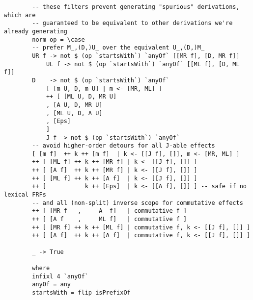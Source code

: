 \small
\begin{verbatim}
		-- these filters prevent generating "spurious" derivations, which are
		-- guaranteed to be equivalent to other derivations we're already generating
		norm op = \case
		-- prefer M_,(D,)U_ over the equivalent U_,(D,)M_
		UR f -> not $ (op `startsWith`) `anyOf` [[MR f], [D, MR f]]
			UL f -> not $ (op `startsWith`) `anyOf` [[ML f], [D, ML f]]
		D    -> not $ (op `startsWith`) `anyOf`
			[ [m U, D, m U] | m <- [MR, ML] ]
			++ [ [ML U, D, MR U]
			, [A U, D, MR U]
			, [ML U, D, A U]
			, [Eps]
			]
			J f -> not $ (op `startsWith`) `anyOf`
		-- avoid higher-order detours for all J-able effects
		[ [m f]  ++ k ++ [m f]  | k <- [[J f], []], m <- [MR, ML] ]
		++ [ [ML f] ++ k ++ [MR f] | k <- [[J f], []] ]
		++ [ [A f]  ++ k ++ [MR f] | k <- [[J f], []] ]
		++ [ [ML f] ++ k ++ [A f]  | k <- [[J f], []] ]
		++ [           k ++ [Eps]  | k <- [[A f], []] ] -- safe if no lexical FRFs
		-- and all (non-split) inverse scope for commutative effects
		++ [ [MR f   ,     A  f]   | commutative f ]
		++ [ [A f    ,     ML f]   | commutative f ]
		++ [ [MR f] ++ k ++ [ML f] | commutative f, k <- [[J f], []] ]
		++ [ [A f]  ++ k ++ [A f]  | commutative f, k <- [[J f], []] ]

		_ -> True

		where
		infixl 4 `anyOf`
		anyOf = any
		startsWith = flip isPrefixOf
	\end{verbatim}
